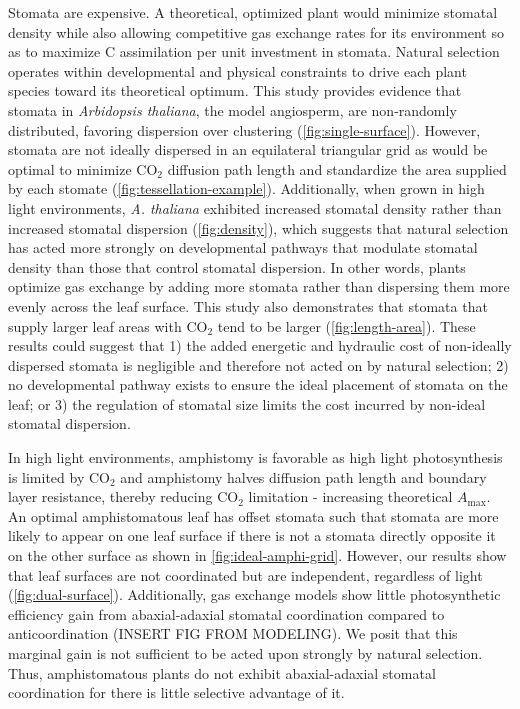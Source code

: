 \documentclass[12pt,halfline,a4paper,]{ouparticle}
\begin{document}
Stomata are expensive. A theoretical, optimized plant would minimize
stomatal density while also allowing competitive gas exchange rates for
its environment so as to maximize C assimilation per unit investment in
stomata. Natural selection operates within developmental and physical
constraints to drive each plant species toward its theoretical optimum.
This study provides evidence that stomata in \emph{Arbidopsis thaliana},
the model angiosperm, are non-randomly distributed, favoring dispersion
over clustering (\autoref{fig:single-surface}). However, stomata are not
ideally dispersed in an equilateral triangular grid as would be optimal
to minimize CO\(_2\) diffusion path length and standardize the area
supplied by each stomate (\autoref{fig:tessellation-example}).
Additionally, when grown in high light environments, \emph{A. thaliana}
exhibited increased stomatal density rather than increased stomatal
dispersion (\autoref{fig:density}), which suggests that natural
selection has acted more strongly on developmental pathways that
modulate stomatal density than those that control stomatal dispersion.
In other words, plants optimize gas exchange by adding more stomata
rather than dispersing them more evenly across the leaf surface. This
study also demonstrates that stomata that supply larger leaf areas with
CO\(_2\) tend to be larger (\autoref{fig:length-area}). These results
could suggest that 1) the added energetic and hydraulic cost of
non-ideally dispersed stomata is negligible and therefore not acted on
by natural selection; 2) no developmental pathway exists to ensure the
ideal placement of stomata on the leaf; or 3) the regulation of stomatal
size limits the cost incurred by non-ideal stomatal dispersion.

In high light environments, amphistomy is favorable as high light
photosynthesis is limited by CO\(_2\) and amphistomy halves diffusion
path length and boundary layer resistance, thereby reducing CO\(_2\)
limitation - increasing theoretical \(A_\text{max}\). An optimal
amphistomatous leaf has offset stomata such that stomata are more likely
to appear on one leaf surface if there is not a stomata directly
opposite it on the other surface as shown in
\autoref{fig:ideal-amphi-grid}. However, our results show that leaf
surfaces are not coordinated but are independent, regardless of light
(\autoref{fig:dual-surface}). Additionally, gas exchange models show
little photosynthetic efficiency gain from abaxial-adaxial stomatal
coordination compared to anticoordination (INSERT FIG FROM MODELING). We
posit that this marginal gain is not sufficient to be acted upon
strongly by natural selection. Thus, amphistomatous plants do not
exhibit abaxial-adaxial stomatal coordination for there is little
selective advantage of it.
\end{document}
